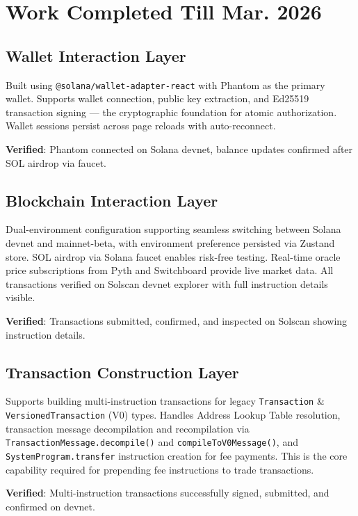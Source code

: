 \documentclass[12pt,a4paper]{article}
\begin{document}
\section{Work Completed Till Mar. 2026}

\subsection{Wallet Interaction Layer}

Built using \texttt{@solana/wallet-adapter-react} with Phantom as the primary wallet. Supports wallet connection, public key extraction, and Ed25519 transaction signing --- the cryptographic foundation for atomic authorization. Wallet sessions persist across page reloads with auto-reconnect.

\textbf{Verified}: Phantom connected on Solana devnet, balance updates confirmed after SOL airdrop via faucet.

\subsection{Blockchain Interaction Layer}

Dual-environment configuration supporting seamless switching between Solana devnet and mainnet-beta, with environment preference persisted via Zustand store. SOL airdrop via Solana faucet enables risk-free testing. Real-time oracle price subscriptions from Pyth and Switchboard provide live market data. All transactions verified on Solscan devnet explorer with full instruction details visible.

\textbf{Verified}: Transactions submitted, confirmed, and inspected on Solscan showing instruction details.

\subsection{Transaction Construction Layer}

Supports building multi-instruction transactions for legacy \texttt{Transaction} \& \texttt{VersionedTransaction} (V0) types. Handles Address Lookup Table resolution, transaction message decompilation and recompilation via \texttt{TransactionMessage.decompile()} and \texttt{compileToV0Message()}, and \texttt{SystemProgram.transfer} instruction creation for fee payments. This is the core capability required for prepending fee instructions to trade transactions.

\textbf{Verified}: Multi-instruction transactions successfully signed, submitted, and confirmed on devnet.
\end{document}
